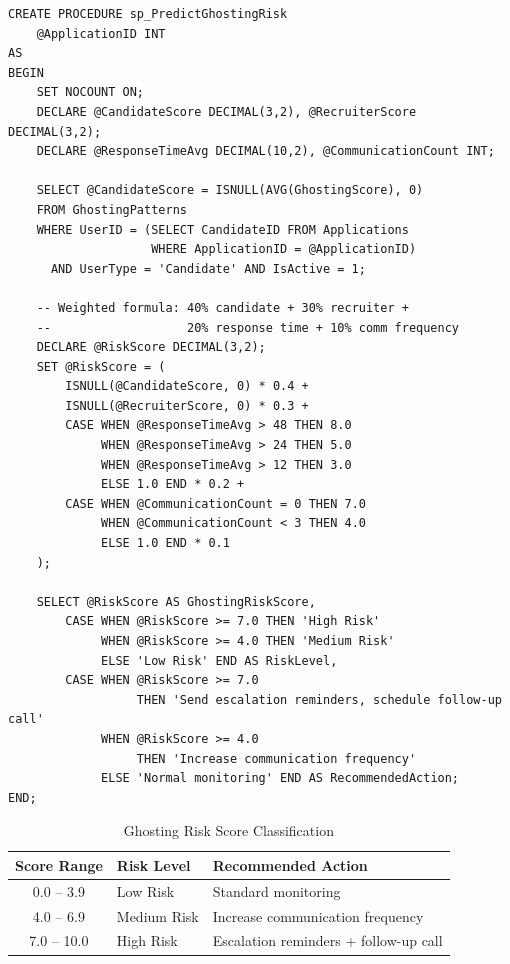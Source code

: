 \documentclass[11pt,a4paper]{article}
\begin{document}
\begin{verbatim}
CREATE PROCEDURE sp_PredictGhostingRisk
    @ApplicationID INT
AS
BEGIN
    SET NOCOUNT ON;
    DECLARE @CandidateScore DECIMAL(3,2), @RecruiterScore DECIMAL(3,2);
    DECLARE @ResponseTimeAvg DECIMAL(10,2), @CommunicationCount INT;

    SELECT @CandidateScore = ISNULL(AVG(GhostingScore), 0)
    FROM GhostingPatterns
    WHERE UserID = (SELECT CandidateID FROM Applications
                    WHERE ApplicationID = @ApplicationID)
      AND UserType = 'Candidate' AND IsActive = 1;

    -- Weighted formula: 40% candidate + 30% recruiter +
    --                   20% response time + 10% comm frequency
    DECLARE @RiskScore DECIMAL(3,2);
    SET @RiskScore = (
        ISNULL(@CandidateScore, 0) * 0.4 +
        ISNULL(@RecruiterScore, 0) * 0.3 +
        CASE WHEN @ResponseTimeAvg > 48 THEN 8.0
             WHEN @ResponseTimeAvg > 24 THEN 5.0
             WHEN @ResponseTimeAvg > 12 THEN 3.0
             ELSE 1.0 END * 0.2 +
        CASE WHEN @CommunicationCount = 0 THEN 7.0
             WHEN @CommunicationCount < 3 THEN 4.0
             ELSE 1.0 END * 0.1
    );

    SELECT @RiskScore AS GhostingRiskScore,
        CASE WHEN @RiskScore >= 7.0 THEN 'High Risk'
             WHEN @RiskScore >= 4.0 THEN 'Medium Risk'
             ELSE 'Low Risk' END AS RiskLevel,
        CASE WHEN @RiskScore >= 7.0
                  THEN 'Send escalation reminders, schedule follow-up call'
             WHEN @RiskScore >= 4.0
                  THEN 'Increase communication frequency'
             ELSE 'Normal monitoring' END AS RecommendedAction;
END;
\end{verbatim}

\begin{table}[H]
    \centering
    \begin{tabular}{|c|l|l|}
        \hline
        \rowcolor{tableheader}
        \color{white}\textbf{Score Range} &
        \color{white}\textbf{Risk Level} &
        \color{white}\textbf{Recommended Action} \\
        \hline
        0.0 -- 3.9  & Low Risk    & Standard monitoring \\
        \hline
        4.0 -- 6.9  & Medium Risk & Increase communication frequency \\
        \hline
        7.0 -- 10.0 & High Risk   & Escalation reminders + follow-up call \\
        \hline
    \end{tabular}
    \caption{Ghosting Risk Score Classification}
\end{table}
\end{document}

